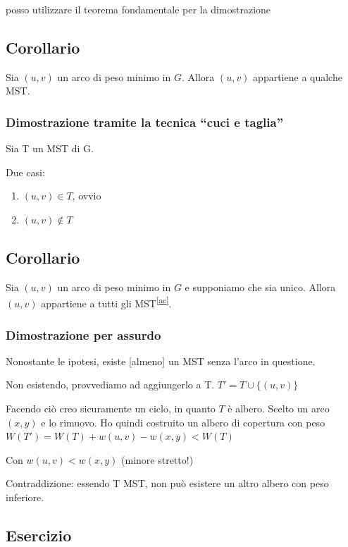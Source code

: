 {posso utilizzare il teorema fondamentale per la dimostrazione}

\subsection{Corollario}

{Sia $(u,v)$ un arco di peso minimo in $G$. Allora $(u,v)$ appartiene a qualche MST.}

\subsubsection{Dimostrazione tramite la tecnica ``cuci e taglia''}

{Sia T un MST di G. }

{Due casi:}

\begin{enumerate}
\tightlist
\item
  $(u,v)\in T${, ovvio}
\item
  $(u,v)\notin T$
\end{enumerate}

\subsection{Corollario}

{Sia $(u,v)$ un arco di peso minimo in $G$ e supponiamo che sia unico. Allora $(u,v)$ appartiene a tutti gli MST}\textsuperscript{\protect\hyperlink{cmnt29}{{[}ac{]}}}{.}

\subsubsection{Dimostrazione per assurdo}

{Nonostante le ipotesi, esiste {[}almeno{]} un MST senza l'arco in
questione.}

{Non esistendo, provvediamo ad aggiungerlo a T. $T' = T \cup \{(u,v)\}$}

{Facendo ciò creo sicuramente un ciclo, in quanto $T$ è albero. Scelto un arco $(x,y)$ e lo rimuovo. Ho quindi costruito un albero di copertura con peso $W(T') = W(T) + w(u,v) - w(x,y) < W(T)$}

{Con $w(u,v) < w(x,y)$ (minore stretto!)}

{Contraddizione}{: essendo T MST, non può esistere un altro albero con peso inferiore.}

\subsection{Esercizio}

